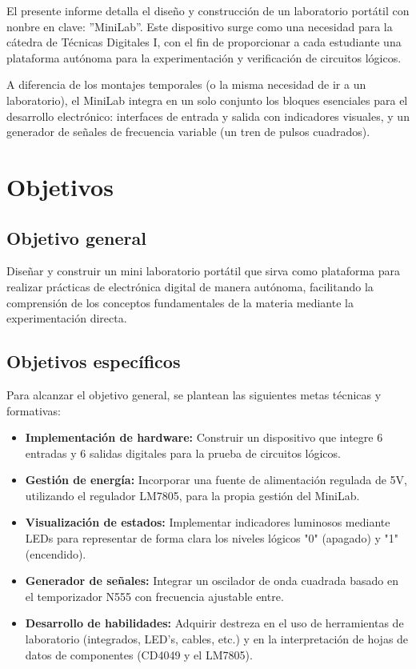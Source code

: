 \documentclass[12pt,a4paper]{article}
\begin{document}

El presente informe detalla el diseño y construcción de un laboratorio portátil con nonbre en clave: ''MiniLab''. Este dispositivo surge como una necesidad para la cátedra de Técnicas Digitales I, con el fin de proporcionar a cada estudiante una plataforma autónoma para la experimentación y verificación de circuitos lógicos.

A diferencia de los montajes temporales (o la misma necesidad de ir a un laboratorio), el MiniLab integra en un solo conjunto los bloques esenciales para el desarrollo electrónico: interfaces de entrada y salida con indicadores visuales, y un generador de señales de frecuencia variable (un tren de pulsos cuadrados). 

\section{Objetivos}


\subsection{Objetivo general}
Diseñar y construir un mini laboratorio portátil que sirva como plataforma para realizar prácticas de electrónica digital de manera autónoma, facilitando la comprensión de los conceptos fundamentales de la materia mediante la experimentación directa.

\subsection{Objetivos específicos}
Para alcanzar el objetivo general, se plantean las siguientes metas técnicas y formativas:

\begin{itemize}[nosep]
	\item \textbf{Implementación de hardware:} Construir un dispositivo que integre 6 entradas y 6 salidas digitales para la prueba de circuitos lógicos.
	\item \textbf{Gestión de energía:} Incorporar una fuente de alimentación regulada de 5V, utilizando el regulador LM7805, para la propia gestión del MiniLab.
	\item \textbf{Visualización de estados:} Implementar indicadores luminosos mediante LEDs para representar de forma clara los niveles lógicos "0" (apagado) y "1" (encendido).
	\item \textbf{Generador de señales:} Integrar un oscilador de onda cuadrada basado en el temporizador N555 con frecuencia ajustable entre.
	\item \textbf{Desarrollo de habilidades:} Adquirir destreza en el uso de herramientas de laboratorio (integrados, LED's, cables, etc.) y en la interpretación de hojas de datos de componentes (CD4049 y el LM7805).
\end{itemize}
\end{document}
